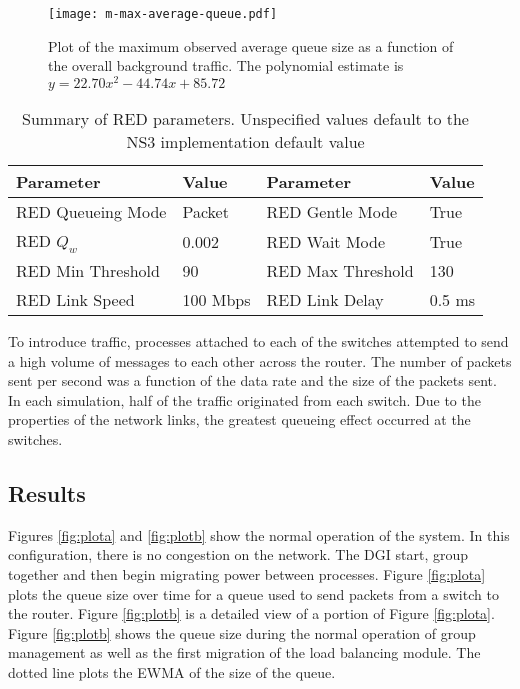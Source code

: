 \begin{figure}
\centering
\texttt{[image: m-max-average-queue.pdf]}
\caption{Plot of the maximum observed average queue size as a function of the overall background traffic. The polynomial estimate is $y=22.70x^2-44.74x+85.72$}
\label{fig:plotm}
\end{figure}

\begin{table}
\begin{center}
\begin{tabular}{ | l | l || l | l | } \hline
Parameter & Value & Parameter & Value        \\ \hline
RED Queueing Mode & Packet & RED Gentle Mode & True    \\ \hline
RED $Q_{w}$ & 0.002 & RED Wait Mode & True      \\ \hline
RED Min Threshold & 90 & RED Max Threshold & 130   \\ \hline
RED Link Speed & 100 Mbps & RED Link Delay & 0.5 ms   \\ \hline
\end{tabular}
\end{center}
\caption{Summary of \ac{RED} parameters. Unspecified values default to the \ac{NS3} implementation default value}
\label{tab:red-parameters}
\end{table}

To introduce traffic, processes attached to each of the switches attempted to send a high volume of messages to each other across the router.
The number of packets sent per second was a function of the data rate and the size of the packets sent.
In each simulation, half of the traffic originated from each switch.
Due to the properties of the network links, the greatest queueing effect occurred at the switches.

\subsection{Results}
\label{sect:results}
Figures \ref{fig:plota} and \ref{fig:plotb} show the normal operation of the system.
In this configuration, there is no congestion on the network. 
The \ac{DGI} start, group together and then begin migrating power between processes.
Figure \ref{fig:plota} plots the queue size over time for a queue used to send packets from a switch to the router.
Figure \ref{fig:plotb} is a detailed view of a portion of Figure \ref{fig:plota}.
Figure \ref{fig:plotb} shows the queue size during the normal operation of group management as well as the first migration of the load balancing module.
The dotted line plots the \ac{EWMA} of the size of the queue.

